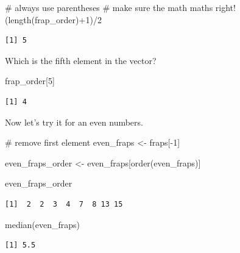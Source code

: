 \documentclass[
  letterpaper,
  DIV=11,
  numbers=noendperiod]{scrreprt}
\newenvironment{Shaded}{\begin{snugshade}}{\end{snugshade}}
\newcommand{\CommentTok}[1]{\textcolor[rgb]{0.37,0.37,0.37}{#1}}
\newcommand{\DecValTok}[1]{\textcolor[rgb]{0.68,0.00,0.00}{#1}}
\newcommand{\FunctionTok}[1]{\textcolor[rgb]{0.28,0.35,0.67}{#1}}
\newcommand{\NormalTok}[1]{\textcolor[rgb]{0.00,0.23,0.31}{#1}}
\newcommand{\OtherTok}[1]{\textcolor[rgb]{0.00,0.23,0.31}{#1}}
\newcommand{\SpecialCharTok}[1]{\textcolor[rgb]{0.37,0.37,0.37}{#1}}
\begin{document}
\begin{Shaded}
\begin{Highlighting}[]
\CommentTok{\# always use parentheses}
\CommentTok{\# make sure the math maths right!}
\NormalTok{(}\FunctionTok{length}\NormalTok{(frap\_order)}\SpecialCharTok{+}\DecValTok{1}\NormalTok{)}\SpecialCharTok{/}\DecValTok{2}
\end{Highlighting}
\end{Shaded}

\begin{verbatim}
[1] 5
\end{verbatim}

Which is the fifth element in the vector?

\begin{Shaded}
\begin{Highlighting}[]
\NormalTok{frap\_order[}\DecValTok{5}\NormalTok{]}
\end{Highlighting}
\end{Shaded}

\begin{verbatim}
[1] 4
\end{verbatim}

Now let's try it for an even numbers.

\begin{Shaded}
\begin{Highlighting}[]
\CommentTok{\# remove first element}
\NormalTok{even\_fraps }\OtherTok{\textless{}{-}}\NormalTok{ fraps[}\SpecialCharTok{{-}}\DecValTok{1}\NormalTok{]}

\NormalTok{even\_fraps\_order }\OtherTok{\textless{}{-}}\NormalTok{ even\_fraps[}\FunctionTok{order}\NormalTok{(even\_fraps)]}

\NormalTok{even\_fraps\_order}
\end{Highlighting}
\end{Shaded}

\begin{verbatim}
[1]  2  2  3  4  7  8 13 15
\end{verbatim}

\begin{Shaded}
\begin{Highlighting}[]
\FunctionTok{median}\NormalTok{(even\_fraps)}
\end{Highlighting}
\end{Shaded}

\begin{verbatim}
[1] 5.5
\end{verbatim}
\end{document}
